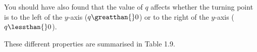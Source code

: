 \label{m39345*id241776}You should have also found that the value of $q$ affects whether the turning point is to the left of the $y$-axis ($q\greatthan{}0$) or to the right of the $y$-axis ($q\lessthan{}0$).\par 
\label{m39345*id241837}These different properties are summarised in Table 1.9.\par 
\setlength\mytablespace{6\tabcolsep}
\addtolength\mytablespace{4\arrayrulewidth}
\setlength\mytablewidth{\linewidth}
\setlength\mytableroom{\mytablewidth}
\addtolength\mytableroom{-\mytablespace}
\setlength\myfixedwidth{0pt}
\setlength\mystarwidth{\mytableroom}
\addtolength\mystarwidth{-\myfixedwidth}
\divide{}
